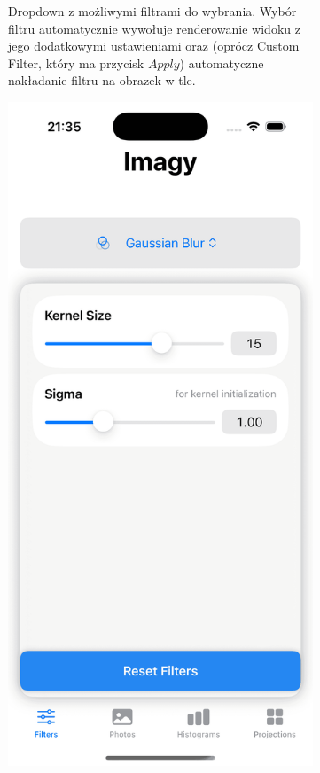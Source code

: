 \documentclass[a4paper]{article}
\begin{document}
\begin{figure}[H]
\begin{subfigure}{0.2\textwidth}
        \caption{Dropdown z możliwymi filtrami do wybrania. Wybór filtru automatycznie wywołuje renderowanie widoku z jego dodatkowymi ustawieniami oraz (oprócz Custom Filter, który ma przycisk $Apply$) automatyczne nakładanie filtru na obrazek w tle.}
        \label{fig:filter_choice}
    \end{subfigure}
    \hfill
    \begin{subfigure}{0.2\textwidth}
        \centering
        \includegraphics[width=\linewidth]{images/filter_options_1.png}

\end{subfigure}
\end{figure}
\end{document}
